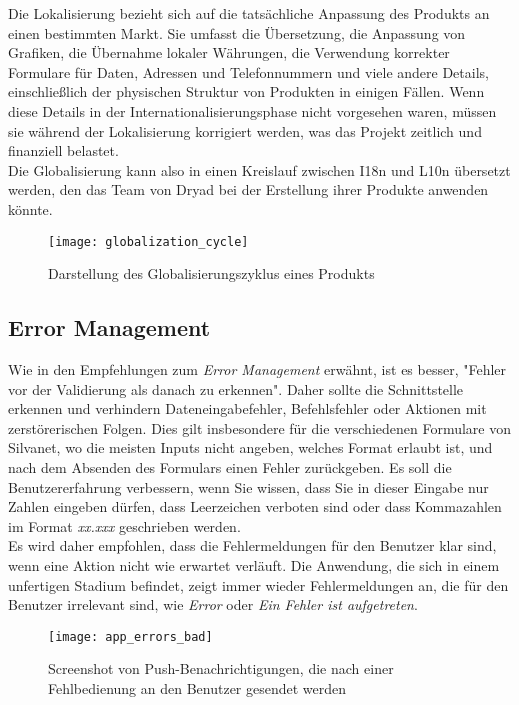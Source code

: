 Die Lokalisierung bezieht sich auf die tatsächliche Anpassung des Produkts an einen bestimmten Markt.
Sie umfasst die Übersetzung, die Anpassung von Grafiken, die Übernahme lokaler Währungen, die Verwendung korrekter Formulare für Daten, Adressen und Telefonnummern und viele andere Details, einschließlich der physischen Struktur von Produkten in einigen Fällen.
Wenn diese Details in der Internationalisierungsphase nicht vorgesehen waren, müssen sie während der Lokalisierung korrigiert werden, was das Projekt zeitlich und finanziell belastet.\\

Die Globalisierung kann also in einen Kreislauf zwischen \ac{I18n} und \ac{L10n} übersetzt werden, den das Team von Dryad bei der Erstellung ihrer Produkte anwenden könnte.

\begin{figure}[H]
  \centering
  \texttt{[image: globalization\_cycle]}
  \caption{Darstellung des Globalisierungszyklus eines Produkts}
  \label{fig:globalization_cycle}
\end{figure}


\subsection{Error Management}

Wie in den Empfehlungen zum \textit{Error Management} erwähnt, ist es besser, "Fehler vor der Validierung als danach zu erkennen".
Daher sollte die Schnittstelle erkennen und verhindern Dateneingabefehler, Befehlsfehler oder Aktionen mit zerstörerischen Folgen.
Dies gilt insbesondere für die verschiedenen Formulare von Silvanet, wo die meisten Inputs nicht angeben, welches Format erlaubt ist, und nach dem Absenden des Formulars einen Fehler zurückgeben.
Es soll die Benutzererfahrung verbessern, wenn Sie wissen, dass Sie in dieser Eingabe nur Zahlen eingeben dürfen, dass Leerzeichen verboten sind oder dass Kommazahlen im Format \textit{xx.xxx} geschrieben werden.\\

Es wird daher empfohlen, dass die Fehlermeldungen für den Benutzer klar sind, wenn eine Aktion nicht wie erwartet verläuft.
Die Anwendung, die sich in einem unfertigen Stadium befindet, zeigt immer wieder Fehlermeldungen an, die für den Benutzer irrelevant sind, wie \textit{Error} oder \textit{Ein Fehler ist aufgetreten}.

\begin{figure}[H]
  \centering
  \texttt{[image: app\_errors\_bad]}
  \caption{Screenshot von Push-Benachrichtigungen, die nach einer Fehlbedienung an den Benutzer gesendet werden}
  \label{fig:app_errors_bad}
\end{figure}

